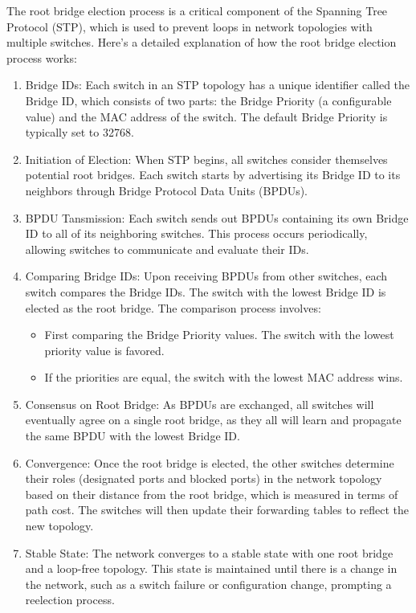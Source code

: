 \documentclass{article}
\begin{document}
The root bridge election process is a critical component of the Spanning Tree Protocol (STP), which is used to prevent loops in network topologies with multiple switches. Here’s a detailed explanation of how the root bridge election process works:
\begin{enumerate}[label=\arabic*.]
\item Bridge IDs: Each switch in an STP topology has a unique identifier called the Bridge ID, which consists of two parts: the Bridge Priority (a configurable value) and the MAC address of the switch. The default Bridge Priority is typically set to 32768.
\item Initiation of Election: When STP begins, all switches consider themselves potential root bridges. Each switch starts by advertising its Bridge ID to its neighbors through Bridge Protocol Data Units (BPDUs).
\item BPDU Tansmission: Each switch sends out BPDUs containing its own Bridge ID to all of its neighboring switches. This process occurs periodically, allowing switches to communicate and evaluate their IDs.
\item Comparing Bridge IDs: Upon receiving BPDUs from other switches, each switch compares the Bridge IDs. The switch with the lowest Bridge ID is elected as the root bridge. The comparison process involves:
	\begin{itemize}
	\item First comparing the Bridge Priority values. The switch with the lowest priority value is favored.
	\item If the priorities are equal, the switch with the lowest MAC address wins.
	\end{itemize}
\item Consensus on Root Bridge: As BPDUs are exchanged, all switches will eventually agree on a single root bridge, as they all will learn and propagate the same BPDU with the lowest Bridge ID.
\item Convergence: Once the root bridge is elected, the other switches determine their roles (designated ports and blocked ports) in the network topology based on their distance from the root bridge, which is measured in terms of path cost. The switches will then update their forwarding tables to reflect the new topology.
\item Stable State: The network converges to a stable state with one root bridge and a loop-free topology. This state is maintained until there is a change in the network, such as a switch failure or configuration change, prompting a reelection process.
\end{enumerate}
\end{document}
